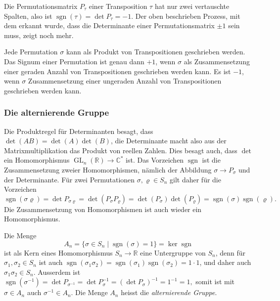 Die Permutationsmatrix $P_\tau$ einer Transposition $\tau$ hat nur
zwei vertauschte Spalten, also ist $\operatorname{sgn}(\tau)=\det P_\tau=-1$.
Der oben beschrieben Prozess, mit dem erkannt wurde, dass die Determinante
einer Permutationsmatrix $\pm 1$ sein muss, zeigt noch mehr.

\begin{satz}
Jede Permutation $\sigma$ kann als Produkt von Transpositionen
geschrieben werden.
Das Signum einer Permutation ist genau dann $+1$, wenn $\sigma$
als Zusammensetzung einer geraden Anzahl von Transpositionen
geschrieben werden kann.
Es ist $-1$, wenn $\sigma$ Zusammensetzung einer ungeraden Anzahl
von Transpositionen geschrieben werden kann.
\end{satz}

%
%
\subsubsection{Die alternierende Gruppe}
Die Produktregel für Determinanten besagt, dass $\det(AB)=\det(A)\det(B)$,
die Determinante macht also aus der Matrixmultiplikation das Produkt von
reellen Zahlen.
Dies besagt auch, dass $\det$ ein Homomorphismus
$\operatorname{GL}_n(\mathbb{R}) \to \mathbb{C}^*$ ist.
Das Vorzeichen $\operatorname{sgn}$ ist die Zusammensetzung zweier
Homomorphismen, nämlich der Abbildung $\sigma\to P_\sigma$
und der Determinante.
Für zwei Permutationen $\sigma,\varrho\in S_n$ gilt daher für die Vorzeichen
\[
\operatorname{sgn}(\sigma\varrho)
=
\det P_{\sigma\varrho}
=
\det(P_\sigma P_\varrho)
=
\det(P_\sigma)\det( P_\varrho)
=
\operatorname{sgn}(\sigma)
\operatorname{sgn}(\varrho).
\]
Die Zusammensetzung von Homomorphismen ist auch wieder ein Homomorphismus.

Die Menge
\[
A_n
=
\{ \sigma\in S_n \mid \operatorname{sgn}(\sigma) = 1 \}
=
\ker
\operatorname{sgn}
\]
ist als Kern eines Homomorphismus $S_n\to\mathbb{R}$
eine Untergruppe von $S_n$, denn für $\sigma_1,\sigma_2\in S_n$ ist auch
\(
\operatorname{sgn}(\sigma_1\sigma_2)
=
\operatorname{sgn}(\sigma_1)
\operatorname{sgn}(\sigma_2)
=
1\cdot 1
\),
und daher auch $\sigma_1\sigma_2\in S_n$.
Ausserdem ist 
\(
\operatorname{sgn}(\sigma^{-1})=\det P_{\sigma^{-1}}
=
\det P_\sigma^{-1}
=
(\det P_\sigma)^{-1}
=
1^{-1}=1,
\)
somit ist mit $\sigma\in A_n$ auch $\sigma^{-1}\in A_n$.
Die Menge $A_n$ heisst die {\em alternierende Gruppe}.

